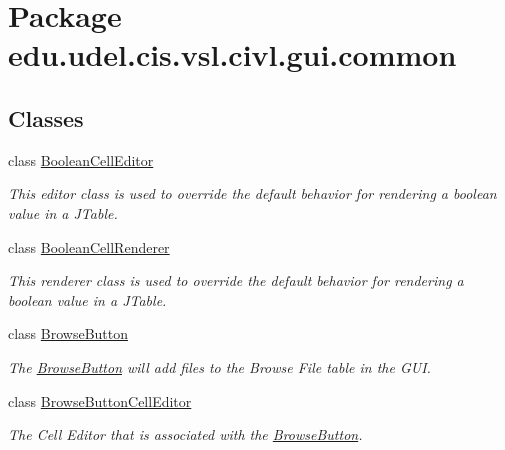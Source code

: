 \hypertarget{namespaceedu_1_1udel_1_1cis_1_1vsl_1_1civl_1_1gui_1_1common}{}\section{Package edu.\+udel.\+cis.\+vsl.\+civl.\+gui.\+common}
\label{namespaceedu_1_1udel_1_1cis_1_1vsl_1_1civl_1_1gui_1_1common}
\subsection*{Classes}
\begin{DoxyCompactItemize}
\item 
class \hyperlink{classedu_1_1udel_1_1cis_1_1vsl_1_1civl_1_1gui_1_1common_1_1BooleanCellEditor}{Boolean\+Cell\+Editor}
\begin{DoxyCompactList}\small\item\em This editor class is used to override the default behavior for rendering a boolean value in a J\+Table. \end{DoxyCompactList}\item 
class \hyperlink{classedu_1_1udel_1_1cis_1_1vsl_1_1civl_1_1gui_1_1common_1_1BooleanCellRenderer}{Boolean\+Cell\+Renderer}
\begin{DoxyCompactList}\small\item\em This renderer class is used to override the default behavior for rendering a boolean value in a J\+Table. \end{DoxyCompactList}\item 
class \hyperlink{classedu_1_1udel_1_1cis_1_1vsl_1_1civl_1_1gui_1_1common_1_1BrowseButton}{Browse\+Button}
\begin{DoxyCompactList}\small\item\em The \hyperlink{classedu_1_1udel_1_1cis_1_1vsl_1_1civl_1_1gui_1_1common_1_1BrowseButton}{Browse\+Button} will add files to the Browse File table in the G\+U\+I. \end{DoxyCompactList}\item 
class \hyperlink{classedu_1_1udel_1_1cis_1_1vsl_1_1civl_1_1gui_1_1common_1_1BrowseButtonCellEditor}{Browse\+Button\+Cell\+Editor}
\begin{DoxyCompactList}\small\item\em The Cell Editor that is associated with the \hyperlink{classedu_1_1udel_1_1cis_1_1vsl_1_1civl_1_1gui_1_1common_1_1BrowseButton}{Browse\+Button}. \end{DoxyCompactList}\item 

\end{DoxyCompactItemize}
